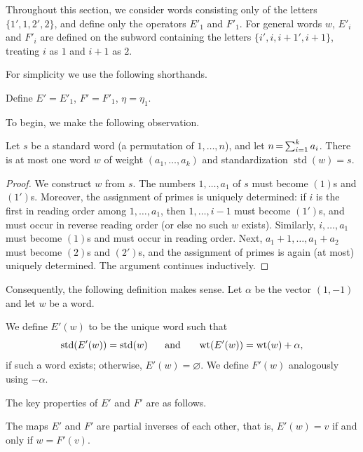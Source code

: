 \documentclass[ALCO,ThmDefs,Unicode,epreuves]{cedram}
\DeclareMathOperator{\std}{std}
\DeclareMathOperator{\wt}{wt}
\newcommand*{\Mk}{\mkern -2mu}
\begin{document}
Throughout this section, we consider words consisting only of the letters $\{1',1,2',2\}$, and define only the operators $E'_1$ and $F'_1$. For general words $w$, $E'_i$ and $F'_i$ are defined on the subword containing the letters $\{i',i,i{+}1',i{+}1\}$, treating $i$ as $1$ and $i{+}1$ as $2$.

For simplicity we use the following shorthands.

\begin{defi}
Define $E' = E'_1$, $F' = F'_1$, $\eta= \eta_1.$
\end{defi}

To begin, we make the following observation.

\begin{lemma} \label{lem:unstandardize}
Let $s$ be a standard word \textup{(}\ie a permutation of $1, \ldots, n$\textup{)}, and let $n \Mk =\Mk  \sum_{i=1}^k a_i$. There is at most one word $w$ of weight $(a_1,\ldots,a_k)$ and standardization $\std (w) = s$.
\end{lemma}

\begin{proof}
We construct $w$ from $s$. The numbers $1, \ldots, a_1$ of $s$ must become $(1)$s and $(1')$s. Moreover, the assignment of primes is uniquely determined: if $i$ is the first in reading order among $1, \ldots, a_1$, then $1, \ldots, i-1$ must become $(1')$s, and must occur in reverse reading order (or else no such $w$ exists). Similarly, $i, \ldots, a_1$ must become $(1)$s and must occur in reading order. Next, $a_1+1, \ldots, a_1+a_2$ must become $(2)$s and $(2')$s, and the assignment of primes is again (at most) uniquely determined. The argument continues inductively.
\end{proof}

Consequently, the following definition makes sense. Let $\alpha$ be the vector $(1,-1)$ and let $w$ be a word.

\begin{defi} \label{def:primed-operators}
We define $E'(w)$ to be the unique word such that
\[
\std (E'(w)) = \std (w) \hspace{0.5cm}\text{ and }\hspace{0.5cm} \wt (E'(w)) = \wt (w) + \alpha,
\]
if such a word exists; otherwise, $E'(w) = \varnothing$. We define $F'(w)$ analogously using $-\alpha$.
\end{defi}

The key properties of $E'$ and $F'$ are as follows.

\begin{prop} \label{prop:primed-partial-inverses}
The maps $E'$ and $F'$ are partial inverses of each other, that is, $E'(w) = v$ if and only if $w = F'(v)$.
\end{prop}
\end{document}
